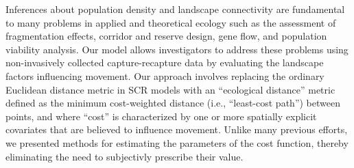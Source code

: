 \documentclass[12pt]{article}
\begin{document}
\begin{spacing}{1.8}

Inferences about population density and landscape connectivity
are fundamental to many problems in
applied and theoretical ecology such as the assessment of fragmentation
effects, corridor and reserve design, gene flow, and population viability
analysis.  Our  model allows
investigators to address these problems using non-invasively collected
capture-recapture data by evaluating the landscape
factors influencing movement. %
Our approach involves replacing the ordinary Euclidean distance metric
in SCR models with %
an ``ecological distance'' metric defined as the minimum cost-weighted
distance (i.e., ``least-cost
path'') between points, and where ``cost'' is characterized by one or
more spatially explicit covariates that are believed to influence
movement. %
Unlike many previous efforts, we presented methods for estimating the
parameters of the cost function, thereby eliminating the need to
subjectivly prescribe their value.

\end{spacing}
\end{document}
